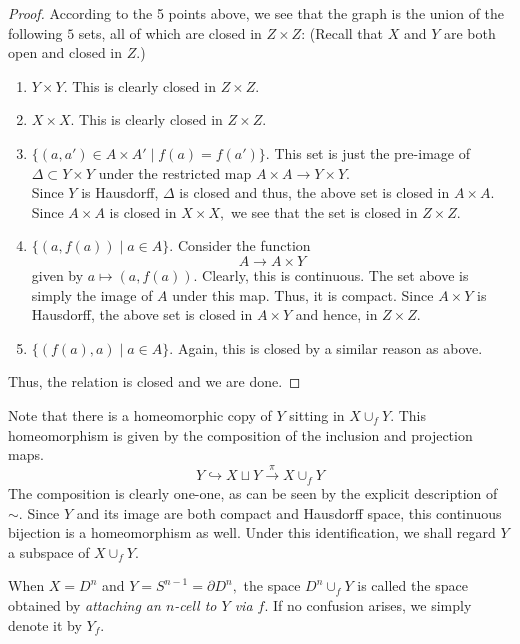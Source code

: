 \documentclass[12pt]{article}
\begin{document}
\begin{proof}
	According to the 5 points above, we see that the graph is the union of the following $5$ sets, all of which are closed in $Z \times Z$: (Recall that $X$ and $Y$ are both open and closed in $Z.$)
	\begin{enumerate}
		\item $Y \times Y.$ This is clearly closed in $Z \times Z.$
		\item $X \times X.$ This is clearly closed in $Z \times Z.$
		\item $\{(a, a') \in A \times A' \mid f(a) = f(a')\}.$ This set is just the pre-image of $\Delta\subset Y \times Y$ under the restricted map $A \times A \to Y \times Y.$\\
		Since $Y$ is Hausdorff, $\Delta$ is closed and thus, the above set is closed in $A \times A.$ Since $A \times A$ is closed in $X \times X,$ we see that the set is closed in $Z \times Z.$
		\item $\{(a, f(a)) \mid a \in A\}.$ Consider the function
		\begin{equation*} 
			A \to A \times Y
		\end{equation*}
		given by $a \mapsto (a, f(a)).$ Clearly, this is continuous. The set above is simply the image of $A$ under this map. Thus, it is compact. Since $A \times Y$ is Hausdorff, the above set is closed in $A \times Y$ and hence, in $Z \times Z.$
		\item $\{(f(a), a) \mid a \in A\}.$ Again, this is closed by a similar reason as above.
	\end{enumerate}

	Thus, the relation is closed and we are done.
\end{proof}

Note that there is a homeomorphic copy of $Y$ sitting in $X \cup_f Y.$ This homeomorphism is given by the composition of the inclusion and projection maps.
\begin{equation*} 
	Y \hookrightarrow X \sqcup Y \overset{\pi}{\longrightarrow} X \cup_f Y
\end{equation*}
The composition is clearly one-one, as can be seen by the explicit description of $\sim.$ Since $Y$ and its image are both compact and Hausdorff space, this continuous bijection is a homeomorphism as well. Under this identification, we shall regard $Y$ a subspace of $X \cup_f Y.$

\begin{defn}
	When $X = D^n$ and $Y = S^{n-1} = \partial D^n,$ the space $D^n \cup_f Y$ is called the space obtained by \emph{attaching an $n$-cell to $Y$ via $f$}. If no confusion arises, we simply denote it by $Y_f.$
\end{defn}
\end{document}
